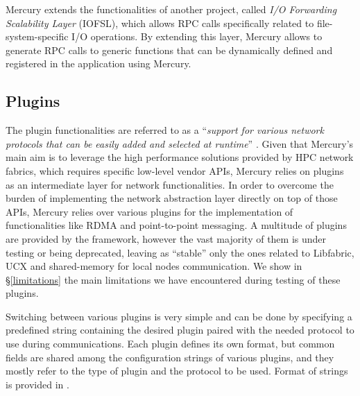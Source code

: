 Mercury extends the functionalities of another project, called \textit{I/O Forwarding Scalability Layer} (IOFSL)\cite{iofsl}, which allows RPC calls specifically related to file-system-specific I/O operations. By extending this layer, Mercury allows to generate RPC calls to generic functions that can be dynamically defined and registered in the application using Mercury.

\subsection{Plugins}
\label{plugins}
The plugin functionalities are referred to as a ``\textit{support for various network protocols that can be easily added and selected at runtime}'' \cite{nal_guide}.
Given that Mercury's main aim is to leverage the high performance solutions provided by HPC network fabrics, which requires specific low-level vendor APIs, Mercury relies on plugins as an intermediate layer for network functionalities. In order to overcome the burden of implementing the network abstraction layer directly on top of those APIs, Mercury relies over various plugins for the implementation of functionalities like RDMA and point-to-point messaging. A multitude of plugins are provided by the framework, however the vast majority of them is under testing or being deprecated, leaving as ``stable'' only the ones related to Libfabric, UCX and shared-memory \cite{sm_plugin} for local nodes communication. We show in \S\ref{limitations} the main limitations we have encountered during testing of these plugins.\newline

Switching between various plugins is very simple and can be done by specifying a predefined string containing the desired plugin paired with the needed protocol to use during communications. Each plugin defines its own format, but common fields are shared among the configuration strings of various plugins, and they mostly refer to the type of plugin and the protocol to be used. Format of strings is provided in .

